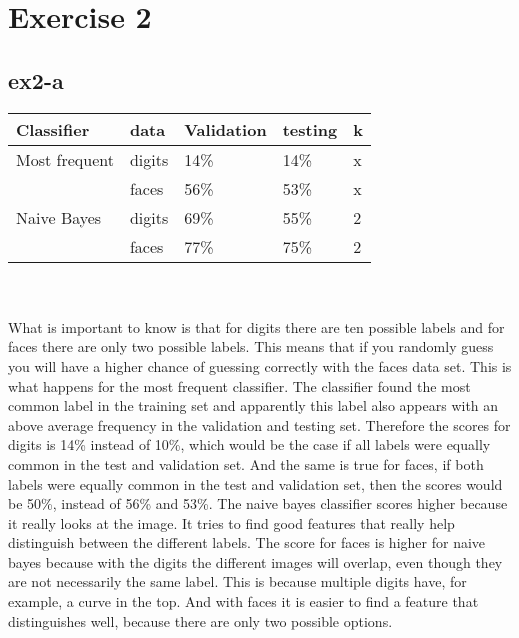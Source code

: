 \section{Exercise 2}
\subsection{ex2-a}
\begin{table}[]
\begin{tabular}{|l|l||l|l||l|}
\hline
Classifier    & data   & Validation & testing & k \\ \hline
Most frequent & digits & 14\%       & 14\%    & x \\ 
              & faces  & 56\%       & 53\%    & x \\ \hline
Naive Bayes   & digits & 69\%       & 55\%    & 2 \\ 
              & faces  & 77\%       & 75\%    & 2 \\ \hline

\end{tabular}
\end{table}
\\
\\

What is important to know is that for digits there are ten possible labels and for faces there
are only two possible labels. This means that if you randomly guess you will have a higher chance
of guessing correctly with the faces data set. This is what happens for the most frequent 
classifier. The classifier found the most common label in the training set and apparently 
this label also appears with an above average frequency in the validation and testing set.
Therefore the scores for digits is 14\% instead of 10\%, which would be the case if all labels
were equally common in the test and validation set. And the same is true for faces, if both 
labels were equally common in the test and validation set, then the scores would be 50\%, 
instead of 56\% and 53\%.
The naive bayes classifier scores higher because it really looks at the image. It tries to
find good features that really help distinguish between the different labels.
The score for faces is higher for naive bayes because with the digits the different images will
overlap, even though they are not necessarily the same label. This is because multiple digits 
have, for example, a curve in the top. And with faces it is easier to find a feature that
distinguishes well, because there are only two possible options.

